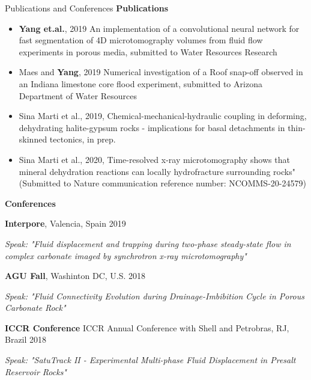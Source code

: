 \documentclass{resume} %
\newenvironment{indentpar}[1]%
  {\begin{list}{}%
          {\setlength{\leftmargin}{#1}}%
          \item[]%
  }
  {\end{list}}
\begin{document}
\begin{rSection}{Publications and Conferences}
\textbf{Publications}
\begin{indentpar}{0.5cm}
\begin{itemize}
    \item \textbf{Yang et.al.}, 2019 An implementation of a convolutional neural network for fast segmentation of 4D microtomography volumes from fluid flow experiments in porous media, submitted to Water Resources Research
    \item Maes and \textbf{Yang}, 2019 Numerical investigation of a Roof snap-off observed in an Indiana limestone core flood experiment, submitted to Arizona Department of Water Resources
    \item Sina Marti et al., 2019, Chemical-mechanical-hydraulic coupling in deforming, dehydrating halite-gypsum rocks - implications for basal detachments in thin-skinned tectonics, in prep.
    \item Sina Marti et al., 2020, Time-resolved x-ray microtomography shows that mineral dehydration reactions can locally hydrofracture surrounding rocks" (Submitted to Nature communication reference number: NCOMMS-20-24579)
\end{itemize}
\end{indentpar}

\textbf{Conferences}
\begin{indentpar}{0.5cm}
\textbf{Interpore}, Valencia, Spain \hfill {2019}
\begin{indentpar}{0.5cm}
\textit {Speak: "Fluid displacement and trapping during two-phase steady-state flow in complex carbonate imaged by synchrotron x-ray microtomography"}
\end{indentpar}

\textbf{AGU Fall}, Washinton DC, U.S. \hfill {2018}
\begin{indentpar}{0.5cm}
\textit {Speak: "Fluid Connectivity Evolution during Drainage-Imbibition Cycle in Porous Carbonate Rock"}
\end{indentpar}

\textbf{ICCR Conference} ICCR Annual Conference with Shell and Petrobras, RJ, Brazil \hfill {2018}
\begin{indentpar}{0.5cm}
\textit {Speak: "SatuTrack II - Experimental Multi-phase Fluid Displacement in Presalt Reservoir Rocks"}


\end{indentpar}
\end{indentpar}
\end{rSection}
\end{document}
